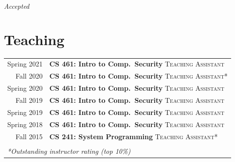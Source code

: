 \documentclass[10pt,singlecolumn]{article} %
\begin{document}
{\raggedleft\textit{Accepted}\par}
\vspace{6pt}




\section{Teaching} 

\begin{tabular}{rl}
Spring 2021    & \textbf{CS 461: Intro to Comp.\ Security} \textsc{Teaching Assistant}\\ 
Fall 2020    & \textbf{CS 461: Intro to Comp.\ Security} \textsc{Teaching Assistant*}\\ 
Spring 2020	 & \textbf{CS 461: Intro to Comp.\ Security} \textsc{Teaching Assistant}\\ 
Fall 2019	 & \textbf{CS 461: Intro to Comp.\ Security} \textsc{Teaching Assistant}\\
Spring 2019	 & \textbf{CS 461: Intro to Comp.\ Security} \textsc{Teaching Assistant}\\  
Spring 2018	 & \textbf{CS 461: Intro to Comp.\ Security} \textsc{Teaching Assistant}\\ 
Fall 2015	 & \textbf{CS 241: System Programming} \textsc{Teaching Assistant*}\\ \\
\multicolumn{2}{l}{\textit{*Outstanding instructor rating (top 10\%)}}
\end{tabular}\\[10pt]



\end{document}
